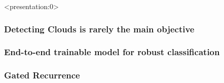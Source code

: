 \documentclass[%
  aspectratio=169,
  9pt,
ngerman,
  light,
  mathserif,
  professionalfont,
  affiliationintitlepagehead,
  titlegraphic,
   affiliation,
   navigationbar,
  progressbar,
]{beamer}
\begin{document}


\begin{frame}<presentation:0>

\frametitle{Detecting Clouds is rarely the main objective}
\LARGE
\centering\figcloudfilteringpipeline

\end{frame}

%


%
%

%
%
%
%
%


\begin{frame}
\frametitle{End-to-end trainable model for robust classification}
\LARGE
\centering\figourapproach		

\end{frame}

\begin{frame}
	\frametitle{Gated Recurrence}
	
	
\end{frame}

\newcommand{\attention}{
\begin{tikzpicture}[scale=0.25]
\foreach \t in {1,2,3,4} {
	\node[draw, circle, inner sep=.2em] at (\t, 0){};
}
\end{tikzpicture}
}

\newcommand{\attnv}{
	\begin{tikzpicture}[scale=0.25]
	\foreach \t in {1,2,3,4} {
		\node[draw, circle, inner sep=.2em] at (0, \t){};
	}
	\end{tikzpicture}
}

\newcommand{\attnout}{
	\begin{tikzpicture}[scale=0.25]
	\foreach \t in {1} {
		\node[draw, circle, inner sep=.2em] at (0, \t){};
	}
	\end{tikzpicture}
}
\end{document}
